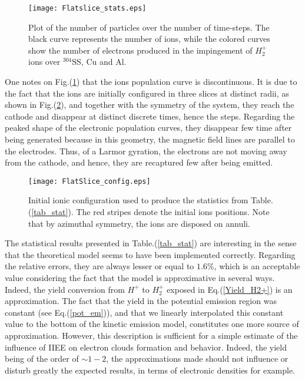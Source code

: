 \begin{figure}[h!]
\centering
	\texttt{[image: Flatslice\_stats.eps]}
	\caption{\label{flat_slice} Plot of the number of particles over the number of time-steps. The black curve represents the number of ions, while the colored curves show the number of electrons produced in the impingement of $H_2^+$ ions over $^{304}$SS, Cu and Al.}
\end{figure}  

\noindent One notes on Fig.(\ref{flat_slice}) that the ions population curve is discontinuous. It is due to the fact that the ions are initially configured in three slices at distinct radii, as shown in Fig.(\ref{slice_config}), and together with the symmetry of the system, they reach the cathode and disappear at distinct discrete times, hence the steps. Regarding the peaked shape of the electronic population curves, they disappear few time after being generated because in this geometry, the magnetic field lines are parallel to the electrodes. Thus, of a Larmor gyration, the electrons are not moving away from the cathode, and hence, they are recaptured few after being emitted.\\

\begin{figure}[h!]
\centering
	\texttt{[image: FlatSlice\_config.eps]}
	\caption{\label{slice_config}  Initial ionic configuration used to produce the statistics from Table.(\ref{tab_stat}). The red stripes denote the initial ions positions. Note that by azimuthal symmetry, the ions are disposed on annuli. }
\end{figure}  

The statistical results presented in Table.(\ref{tab_stat}) are interesting in the sense that the theoretical model seems to have been implemented correctly. Regarding the relative errors, they are always lesser or equal to $1.6\%$, which is an acceptable value considering the fact that the model is approximative in several ways. Indeed, the yield conversion from $H^+$ to $H_2^{+}$ exposed in Eq.(\ref{Yield_H2+}) is an approximation. The fact that the yield in the potential emission region was constant (see Eq.(\ref{pot_em})), and that we linearly interpolated this constant value to the bottom of the kinetic emission model, constitutes one more source of approximation. However, this description is sufficient for a simple estimate of the influence of IIEE on electron clouds formation and behavior. Indeed, the yield being of the order of $\sim 1-2$, the approximations made should not influence or disturb greatly the expected results, in terms of electronic densities for example. \\

